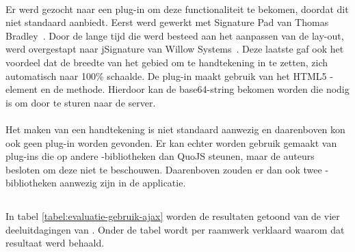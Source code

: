 \paragraph{\jqm}
Er werd gezocht naar een plug-in om deze functionaliteit te bekomen, doordat \jqm{} dit niet standaard aanbiedt. 
Eerst werd gewerkt met Signature Pad van Thomas Bradley~\cite{Bradley2013}. 
Door de lange tijd die werd besteed aan het aanpassen van de lay-out, werd overgestapt naar jSignature van Willow Systems~\cite{Systems2013}. 
Deze laatste gaf ook het voordeel dat de breedte van het gebied om te handtekening in te zetten, zich automatisch naar 100\% schaalde. 
De plug-in maakt gebruik van het HTML5 -element en de  methode.
Hierdoor kan de base64-string bekomen worden die nodig is om door te sturen naar de server.

\paragraph{\lungo}
Het maken van een handtekening is niet standaard aanwezig en daarenboven kon ook geen plug-in worden gevonden.
Er kan echter worden gebruik gemaakt van plug-ins die op andere \js{}-bibliotheken dan QuoJS steunen, maar de auteurs besloten om deze niet te beschouwen.
Daarenboven zouden er dan ook twee \js{}-bibliotheken aanwezig zijn in de applicatie.



\subsection{}
\label{sec:evaluatie-gebruik-ajax}

In tabel \ref{tabel:evaluatie-gebruik-ajax} worden de resultaten getoond van de vier deeluitdagingen van .
Onder de tabel wordt per raamwerk verklaard waarom dat resultaat werd behaald.

\begin{table}[H]
\centering
{}
\caption{Gebruik van  voor \st{}~(\sta), \kendo{}~(\kendoa), \jqm{}~(\jqma) en \lungo{}~(\lungoa).}
\label{tabel:evaluatie-gebruik-ajax}
\end{table}

